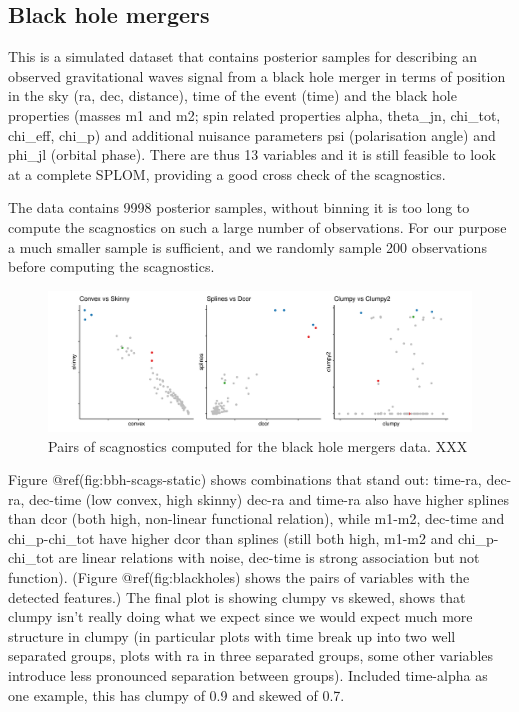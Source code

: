\hypertarget{black-hole-mergers}{%
\subsection{Black hole mergers}\label{black-hole-mergers}}

This is a simulated dataset that contains posterior samples for
describing an observed gravitational waves signal from a black hole
merger in terms of position in the sky (ra, dec, distance), time of the
event (time) and the black hole properties (masses m1 and m2; spin
related properties alpha, theta\_jn, chi\_tot, chi\_eff, chi\_p) and
additional nuisance parameters psi (polarisation angle) and phi\_jl
(orbital phase). There are thus 13 variables and it is still feasible to
look at a complete SPLOM, providing a good cross check of the
scagnostics.

The data contains 9998 posterior samples, without binning it is too long
to compute the scagnostics on such a large number of observations. For
our purpose a much smaller sample is sufficient, and we randomly sample
200 observations before computing the scagnostics.

\begin{Schunk}
\begin{figure}
\includegraphics[width=1\linewidth]{mason-lee-laa-cook_files/figure-latex/bbh-scags-static-1} \caption[Pairs of scagnostics computed for the black hole mergers data]{Pairs of scagnostics computed for the black hole mergers data. XXX}\label{fig:bbh-scags-static}
\end{figure}
\end{Schunk}

Figure @ref(fig:bbh-scags-static) shows combinations that stand out:
time-ra, dec-ra, dec-time (low convex, high skinny) dec-ra and time-ra
also have higher splines than dcor (both high, non-linear functional
relation), while m1-m2, dec-time and chi\_p-chi\_tot have higher dcor
than splines (still both high, m1-m2 and chi\_p-chi\_tot are linear
relations with noise, dec-time is strong association but not function).
(Figure @ref(fig:blackholes) shows the pairs of variables with the
detected features.) The final plot is showing clumpy vs skewed, shows
that clumpy isn't really doing what we expect since we would expect much
more structure in clumpy (in particular plots with time break up into
two well separated groups, plots with ra in three separated groups, some
other variables introduce less pronounced separation between groups).
Included time-alpha as one example, this has clumpy of 0.9 and skewed of
0.7.

